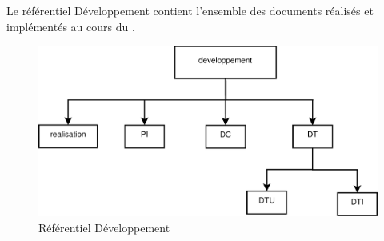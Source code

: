 Le référentiel Développement contient l’ensemble des documents réalisés et implémentés au cours du \picCourt.

\clearpage

\begin{figure}[ht]
         \begin{center}
         \includegraphics[scale=0.5]{images/arboDeveloppement}
         \end{center}
         \caption{Référentiel Développement}
 \end{figure}
